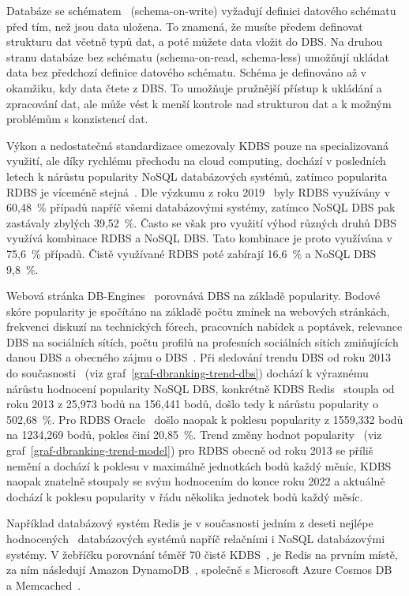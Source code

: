 \documentclass[czech,master,dept460,male,csharp,cpdeclaration]{diploma}
\begin{document}
	Databáze se schématem~\cite{schemaless-vs-schema} (schema-on-write) vyžadují definici datového schématu před tím, než jsou data uložena. To znamená, že musíte předem definovat strukturu dat včetně typů dat, a poté můžete data vložit do DBS. Na druhou stranu databáze bez schématu (schema-on-read, schema-less) umožňují ukládat data bez předchozí definice datového schématu. Schéma je definováno až v okamžiku, kdy data čtete z DBS. To umožňuje pružnější přístup k ukládání a zpracování dat, ale může vést k menší kontrole nad strukturou dat a k možným problémům s konzistencí dat.
	
	Výkon a nedostatečná standardizace omezovaly KDBS pouze na specializovaná využití, ale díky rychlému přechodu na cloud computing, dochází v posledních letech k nárůstu popularity NoSQL databázových systémů, zatímco popularita RDBS je víceméně stejná~\cite{dbranking-trend-by-model}. Dle výzkumu z roku 2019~\cite{scalegrid-sql-vs-nosql} byly RDBS využívány v 60,48~\% případů napříč všemi databázovými systémy, zatímco NoSQL DBS pak zastávaly zbylých 39,52~\%. Často se však pro využití výhod různých druhů DBS využívá kombinace RDBS a NoSQL DBS. Tato kombinace je proto využívána v 75,6~\% případů. Čistě využívané RDBS poté zabírají 16,6~\% a NoSQL DBS 9,8~\%. 
	
	Webová stránka DB-Engines~\cite{dbranking-web-index} porovnává DBS na základě popularity. Bodové skóre popularity je spočítáno na základě počtu zmínek na webových stránkách, frekvenci diskuzí na technických fórech, pracovních nabídek a poptávek, relevance DBS na sociálních sítích, počtu profilů na profesních sociálních sítích zmiňujících danou DBS a obecného zájmu o DBS~\cite{dbranking-ranking-definition}. Při sledování trendu DBS od roku 2013 do současnosti~\cite{dbranking-trend-by-dbs} (viz graf~\ref{graf-dbranking-trend-dbs}) dochází k výraznému nárůstu hodnocení popularity NoSQL DBS, konkrétně KDBS Redis~\cite{redis} stoupla od roku 2013 z 25,973 bodů na 156,441 bodů, došlo tedy k nárůstu popularity o 502,68~\%. Pro RDBS Oracle~\cite{oracle-index} došlo naopak k poklesu popularity z 1559,332 bodů na 1234,269 bodů, pokles činí 20,85~\%. Trend změny hodnot popularity~\cite{dbranking-trend-by-model} (viz graf~\ref{graf-dbranking-trend-model}) pro RDBS obecně od roku 2013 se příliš nemění a dochází k poklesu v maximálně jednotkách bodů každý měníc, KDBS naopak znatelně stoupaly se svým hodnocením do konce roku 2022 a aktuálně dochází k poklesu popularity v řádu několika jednotek bodů každý měsíc.
	
	Například databázový systém Redis je v současnosti jedním z deseti nejlépe hodnocených~\cite{db-engineers-ranking} databázových systémů napříč relačními i NoSQL databázovými systémy. V žebříčku porovnání téměř 70 čistě KDBS~\cite{db-engineers-ranking-kdbs}, je Redis na prvním místě, za ním následují Amazon DynamoDB~\cite{dynamodb}, společně s Microsoft Azure Cosmos DB~\cite{azure-cosmos-db} a Memcached~\cite{memcached}.
	
\end{document}
